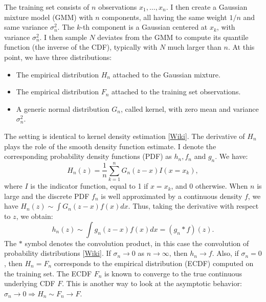 \documentclass[oneside,10pt]{book}
\begin{document}
The training set consists of 
 $n$ observations $x_1,\dots, x_n$. I then create a \textcolor{index}{Gaussian mixture model} (GMM)
 with $n$ components, all having the same weight $1/n$ and same variance $\sigma^2_n$. 
The $k$-th component is a Gaussian centered at $x_k$, with variance $\sigma^2_n$. I then sample $N$ deviates from the GMM to compute its \textcolor{index}{quantile function} (the inverse of the CDF), typically with $N$ much larger
 than $n$. At this point, we have three distributions:\vspace{1ex}

\begin{itemize}
\item The empirical distribution $H_n$ attached to the Gaussian mixture.
\item The empirical distribution $F_n$ attached to the training set observations.
\item A generic normal distribution $G_n$, called \textcolor{index}{kernel}, with zero mean and variance  $\sigma_n^2$. 
\end{itemize}
\vspace{1ex}
\noindent The setting is identical to 
\textcolor{index}{kernel density estimation} [\href{https://en.wikipedia.org/wiki/Kernel_density_estimation}{Wiki}]. The derivative of $H_n$ plays the role of the smooth density function estimate. I denote the corresponding 
\textcolor{index}{probability density functions} (PDF) as
 $h_n, f_n$ and $g_n$. We have:
\begin{equation}
H_n( z) = \frac{1}{n}\sum_{k=1}^n G_n(z-x) I(x = x_k), \label{qeq1}
\end{equation}
where $I$ is the indicator function, equal to 1 if $x=x_k$, and 0 otherwise. When $n$ is large and
 the discrete PDF $f_n$ is well approximated by a continuous density $f$, we have
$H_n(z) \sim \int G_n(z-x) f(x) dx$. Thus, taking the derivative with respect to $z$, we obtain:
\begin{equation}
h_n(z) \sim \int g_n(z-x)f(x) dx = (g_n * f)(z). \label{qeq2}
\end{equation}
The $*$ symbol denotes the \textcolor{index}{convolution product}, in this case
the convolution of probability distributions [\href{https://en.wikipedia.org/wiki/Convolution_of_probability_distributions}{Wiki}]. If $\sigma_n\rightarrow 0$ as $n\rightarrow\infty$,
 then $h_n\rightarrow f$. Also, if $\sigma_n = 0$, then $H_n = F_n$ corresponds to the empirical
 distribution (ECDF) computed on the training set. The ECDF $F_n$ is known to converge to the true
 continuous underlying CDF $F$. This is another way to look at the asymptotic behavior:
 $\sigma_n \rightarrow 0 \Rightarrow H_n \sim F_n \rightarrow F$. 
\end{document}
